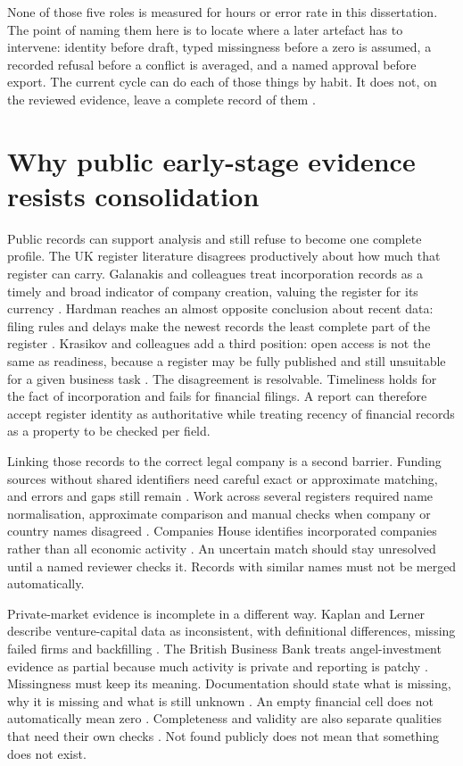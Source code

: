 None of those five roles is measured for hours or error rate in this dissertation. The point of
naming them here is to locate where a later artefact has to intervene: identity before draft,
typed missingness before a zero is assumed, a recorded refusal before a conflict is averaged, and
a named approval before export. The current cycle can do each of those things by habit. It does
not, on the reviewed evidence, leave a complete record of them
\citep{nikiforova2020quality,gao2023alce}.

\section{Why public early-stage evidence resists consolidation}

Public records can support analysis and still refuse to become one complete profile. The UK
register literature disagrees productively about how much that register can carry. Galanakis and
colleagues treat incorporation records as a timely and broad indicator of company creation,
valuing the register for its currency \citep{galanakis2026chrt}. Hardman reaches an almost
opposite conclusion about recent data: filing rules and delays make the newest records the least
complete part of the register \citep{hardman2023small}. Krasikov and colleagues add a third
position: open access is not the same as readiness, because a register may be fully published and
still unsuitable for a given business task \citep{krasikov2020ready}. The disagreement is
resolvable. Timeliness holds for the fact of incorporation and fails for financial filings. A
report can therefore accept register identity as authoritative while treating recency of financial
records as a property to be checked per field.

Linking those records to the correct legal company is a second barrier. Funding sources without
shared identifiers need careful exact or approximate matching, and errors and gaps still remain
\citep{thorne2026funding}. Work across several registers required name normalisation, approximate
comparison and manual checks when company or country names disagreed \citep{surak2026gateways}.
Companies House identifies incorporated companies rather than all economic activity
\citep{galanakis2026chrt}. An uncertain match should stay unresolved until a named reviewer checks
it. Records with similar names must not be merged automatically.

Private-market evidence is incomplete in a different way. Kaplan and Lerner describe venture-capital
data as inconsistent, with definitional differences, missing failed firms and backfilling
\citep{kaplan2016vcdata}. The British Business Bank treats angel-investment evidence as partial
because much activity is private and reporting is patchy \citep{britishbusinessbank2025equity}.
Missingness must keep its meaning. Documentation should state what is missing, why it is missing
and what is still unknown \citep{gebru2021datasheets}. An empty financial cell does not
automatically mean zero \citep{bradley2024synfintabs}. Completeness and validity are also separate
qualities that need their own checks \citep{nikiforova2020quality}. Not found publicly does not
mean that something does not exist.

